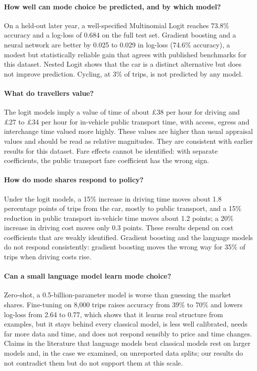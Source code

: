 \documentclass[11pt,a4paper]{article}
\newcommand{\gbp}{\pounds}
\begin{document}
\paragraph{How well can mode choice be predicted, and by which model?}
On a held-out later year, a well-specified Multinomial Logit reaches 73.8\% accuracy and a log-loss of 0.684 on the full test set. Gradient boosting and a neural network are better by 0.025 to 0.029 in log-loss (74.6\% accuracy), a modest but statistically reliable gain that agrees with published benchmarks for this dataset. Nested Logit shows that the car is a distinct alternative but does not improve prediction. Cycling, at 3\% of trips, is not predicted by any model.

\paragraph{What do travellers value?}
The logit models imply a value of time of about \gbp{}38 per hour for driving and \gbp{}27 to \gbp{}34 per hour for in-vehicle public transport time, with access, egress and interchange time valued more highly. These values are higher than usual appraisal values and should be read as relative magnitudes. They are consistent with earlier results for this dataset. Fare effects cannot be identified: with separate coefficients, the public transport fare coefficient has the wrong sign.

\paragraph{How do mode shares respond to policy?}
Under the logit models, a 15\% increase in driving time moves about 1.8 percentage points of trips from the car, mostly to public transport, and a 15\% reduction in public transport in-vehicle time moves about 1.2 points; a 20\% increase in driving cost moves only 0.3 points. These results depend on cost coefficients that are weakly identified. Gradient boosting and the language models do not respond consistently: gradient boosting moves the wrong way for 35\% of trips when driving costs rise.

\paragraph{Can a small language model learn mode choice?}
Zero-shot, a 0.5-billion-parameter model is worse than guessing the market shares. Fine-tuning on 8,000 trips raises accuracy from 39\% to 70\% and lowers log-loss from 2.64 to 0.77, which shows that it learns real structure from examples, but it stays behind every classical model, is less well calibrated, needs far more data and time, and does not respond sensibly to price and time changes. Claims in the literature that language models beat classical models rest on larger models and, in the case we examined, on unreported data splits; our results do not contradict them but do not support them at this scale.
\end{document}
